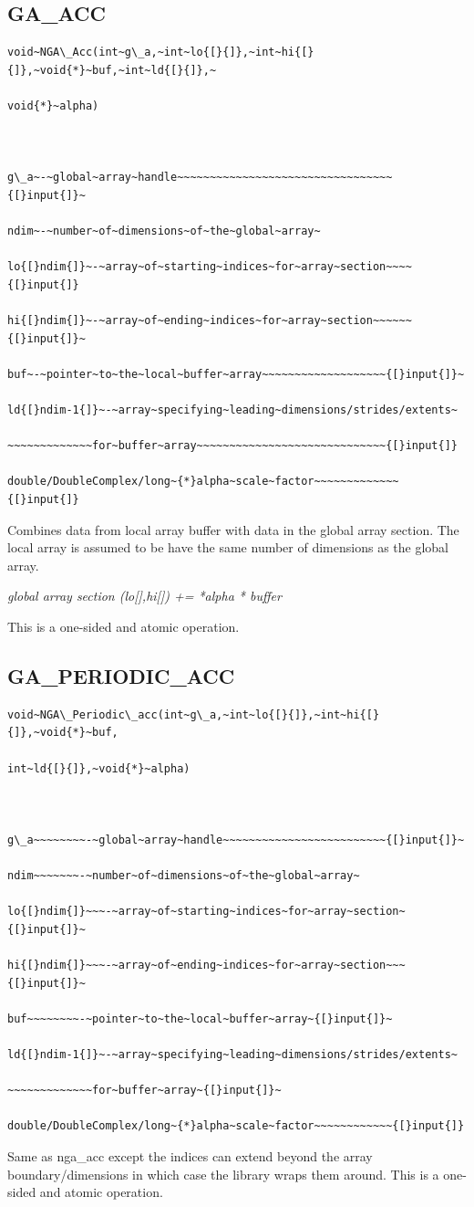\subsection*{\label{sub:GA_ACC}GA\_ACC}
\begin{verbatim}
void~NGA\_Acc(int~g\_a,~int~lo{[}{]},~int~hi{[}{]},~void{*}~buf,~int~ld{[}{]},~

void{*}~alpha)



g\_a~-~global~array~handle~~~~~~~~~~~~~~~~~~~~~~~~~~~~~~~~~{[}input{]}~

ndim~-~number~of~dimensions~of~the~global~array~

lo{[}ndim{]}~-~array~of~starting~indices~for~array~section~~~~{[}input{]}

hi{[}ndim{]}~-~array~of~ending~indices~for~array~section~~~~~~{[}input{]}~

buf~-~pointer~to~the~local~buffer~array~~~~~~~~~~~~~~~~~~~{[}input{]}~

ld{[}ndim-1{]}~-~array~specifying~leading~dimensions/strides/extents~

~~~~~~~~~~~~~for~buffer~array~~~~~~~~~~~~~~~~~~~~~~~~~~~~~{[}input{]}

double/DoubleComplex/long~{*}alpha~scale~factor~~~~~~~~~~~~~{[}input{]}
\end{verbatim}
Combines data from local array buffer with data in the global array
section. The local array is assumed to be have the same number of
dimensions as the global array.

\emph{global array section (lo{[}{]},hi{[}{]}) += {*}alpha {*} buffer}

This is a one-sided and atomic operation.


\subsection*{\label{sub:GA_PERIODIC_ACC}GA\_PERIODIC\_ACC}
\begin{verbatim}
void~NGA\_Periodic\_acc(int~g\_a,~int~lo{[}{]},~int~hi{[}{]},~void{*}~buf,

int~ld{[}{]},~void{*}~alpha)



g\_a~~~~~~~~-~global~array~handle~~~~~~~~~~~~~~~~~~~~~~~~~{[}input{]}~

ndim~~~~~~~-~number~of~dimensions~of~the~global~array~

lo{[}ndim{]}~~~-~array~of~starting~indices~for~array~section~{[}input{]}~

hi{[}ndim{]}~~~-~array~of~ending~indices~for~array~section~~~{[}input{]}~

buf~~~~~~~~-~pointer~to~the~local~buffer~array~{[}input{]}~

ld{[}ndim-1{]}~-~array~specifying~leading~dimensions/strides/extents~

~~~~~~~~~~~~~for~buffer~array~{[}input{]}~

double/DoubleComplex/long~{*}alpha~scale~factor~~~~~~~~~~~~{[}input{]}
\end{verbatim}
Same as nga\_acc except the indices can extend beyond the array boundary/dimensions
in which case the library wraps them around. This is a one-sided and
atomic operation. 


